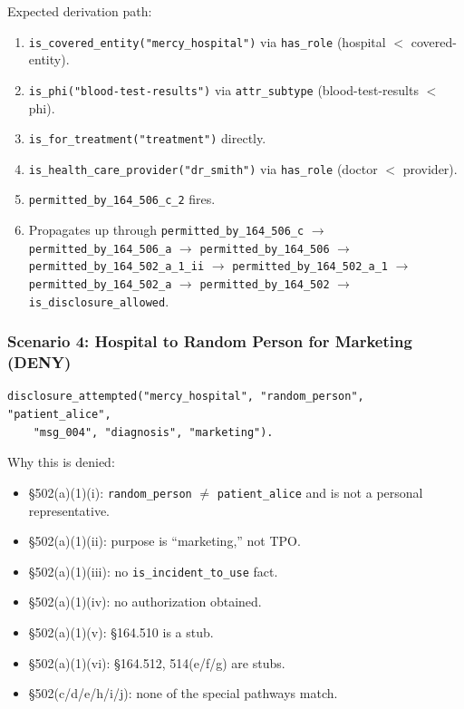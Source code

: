 \documentclass[11pt,letterpaper]{article}
\begin{document}
Expected derivation path:
\begin{enumerate}
  \item \texttt{is\_covered\_entity("mercy\_hospital")} via \texttt{has\_role} (hospital $<$ covered-entity).
  \item \texttt{is\_phi("blood-test-results")} via \texttt{attr\_subtype} (blood-test-results $<$ phi).
  \item \texttt{is\_for\_treatment("treatment")} directly.
  \item \texttt{is\_health\_care\_provider("dr\_smith")} via \texttt{has\_role} (doctor $<$ provider).
  \item \texttt{permitted\_by\_164\_506\_c\_2} fires.
  \item Propagates up through \texttt{permitted\_by\_164\_506\_c} $\to$ \texttt{permitted\_by\_164\_506\_a} $\to$ \texttt{permitted\_by\_164\_506} $\to$ \texttt{permitted\_by\_164\_502\_a\_1\_ii} $\to$ \texttt{permitted\_by\_164\_502\_a\_1} $\to$ \texttt{permitted\_by\_164\_502\_a} $\to$ \texttt{permitted\_by\_164\_502} $\to$ \texttt{is\_disclosure\_allowed}.
\end{enumerate}

\subsubsection{Scenario 4: Hospital to Random Person for Marketing (DENY)}

\begin{lstlisting}[style=soufflestyle,caption={Scenario 4 facts}]
disclosure_attempted("mercy_hospital", "random_person", "patient_alice",
    "msg_004", "diagnosis", "marketing").
\end{lstlisting}

Why this is denied:
\begin{itemize}
  \item \S 502(a)(1)(i): \texttt{random\_person} $\neq$ \texttt{patient\_alice} and is not a personal representative.
  \item \S 502(a)(1)(ii): purpose is ``marketing,'' not TPO.
  \item \S 502(a)(1)(iii): no \texttt{is\_incident\_to\_use} fact.
  \item \S 502(a)(1)(iv): no authorization obtained.
  \item \S 502(a)(1)(v): \S 164.510 is a stub.
  \item \S 502(a)(1)(vi): \S 164.512, 514(e/f/g) are stubs.
  \item \S 502(c/d/e/h/i/j): none of the special pathways match.
\end{itemize}
\end{document}
